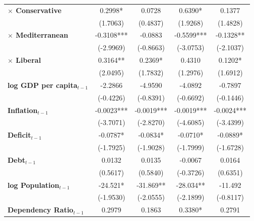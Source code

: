 \begin{center}
\begin{tabular}{lcccc}
\textbf{$\times$ Conservative}         &    0.2998*     &      0.0728      &     0.6390*      &      0.1377       \\
\textbf{ }                         &    (1.7063)    &     (0.4837)     &     (1.9268)     &     (1.4828)      \\
\textbf{$\times$ Mediterranean}        &   -0.3108***   &     -0.0883      &    -0.5599***    &    -0.1328**      \\
\textbf{ }                         &   (-2.9969)    &    (-0.8663)     &    (-3.0753)     &    (-2.1037)      \\
\textbf{$\times$ Liberal}              &    0.3164**    &     0.2369*      &      0.4310      &     0.1202*       \\
\textbf{ }                         &    (2.0495)    &     (1.7832)     &     (1.2976)     &     (1.6912)      \\
\textbf{log GDP per capita$_{t-1}$}           &    -2.2866     &     -4.9590      &     -4.0892      &     -0.7897       \\
\textbf{ }                         &   (-0.4226)    &    (-0.8391)     &    (-0.6692)     &    (-0.1446)      \\
\textbf{Inflation$_{t-1}$}      &   -0.0023***   &    -0.0019***    &    -0.0019***    &    -0.0024***     \\
\textbf{ }                         &   (-3.7071)    &    (-2.8270)     &    (-4.6085)     &    (-3.4399)      \\
\textbf{Deficit$_{t-1}$}             &    -0.0787*    &     -0.0834*     &     -0.0710*     &     -0.0889*      \\
\textbf{ }                         &   (-1.7925)    &    (-1.9028)     &    (-1.7999)     &    (-1.6728)      \\
\textbf{Debt$_{t-1}$}                &     0.0132     &      0.0135      &     -0.0067      &      0.0164       \\
\textbf{ }                         &    (0.5617)    &     (0.5840)     &    (-0.3726)     &     (0.6351)      \\
\textbf{log Population$_{t-1}$}      &    -24.521*    &    -31.869**     &    -28.034**     &     -11.492       \\
\textbf{ }                         &   (-1.9530)    &    (-2.0555)     &    (-2.1899)     &    (-0.8117)      \\
\textbf{Dependency Ratio$_{t-1}$}   &     0.2979     &      0.1863      &     0.3380*      &      0.2791       \\

\end{tabular}
\end{center}
